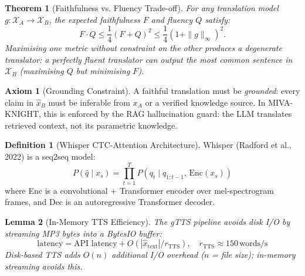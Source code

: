 \documentclass[12pt,a4paper]{article}
\theoremstyle{definition}
\newtheorem{definition}{Definition}[section]
\newtheorem{axiom}{Axiom}[section]
\theoremstyle{plain}
\newtheorem{theorem}{Theorem}[section]
\newtheorem{lemma}[theorem]{Lemma}
\theoremstyle{remark}
\begin{document}
\begin{theorem}[Faithfulness vs. Fluency Trade-off]
For any translation model $g : \mathcal{X}_A \to \mathcal{X}_B$, the expected faithfulness $F$ and fluency $Q$ satisfy:
\[
  F \cdot Q \le \frac{1}{4}(F + Q)^2 \le \frac{1}{4}(1 + \|g\|_\infty)^2.
\]
Maximising one metric without constraint on the other produces a degenerate translator: a perfectly fluent translator can output the most common sentence in $\mathcal{X}_B$ (maximising $Q$ but minimising $F$).
\end{theorem}

\begin{axiom}[Grounding Constraint]
\label{ax:grounding}
A faithful translation must be \emph{grounded}: every claim in $\hat{x}_B$ must be inferable from $x_A$ or a verified knowledge source. In MIVA-KNIGHT, this is enforced by the RAG hallucination guard: the LLM translates retrieved context, not its parametric knowledge.
\end{axiom}

\begin{definition}[Whisper CTC-Attention Architecture]
Whisper (Radford et al., 2022) is a seq2seq model:
\[
  P(\hat{q} \mid x_s) = \prod_{t=1}^T P(q_t \mid q_{1:t-1},\, \text{Enc}(x_s))
\]
where Enc is a convolutional + Transformer encoder over mel-spectrogram frames, and Dec is an autoregressive Transformer decoder.
\end{definition}

\begin{lemma}[In-Memory TTS Efficiency]
The gTTS pipeline avoids disk I/O by streaming MP3 bytes into a BytesIO buffer:
\[
  \text{latency} = \text{API latency} + O(|\hat{x}_{\text{text}}|/r_{\text{TTS}}), \quad r_{\text{TTS}} \approx 150\,\text{words/s}
\]
Disk-based TTS adds $O(n)$ additional I/O overhead ($n$ = file size); in-memory streaming avoids this.
\end{lemma}
\end{document}
